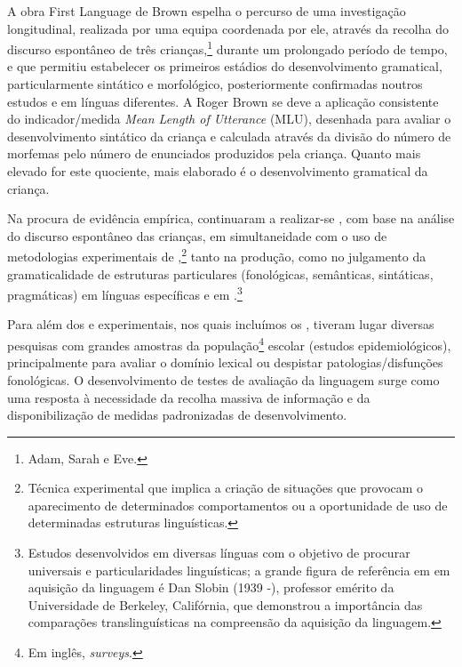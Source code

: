 \documentclass[output=paper]{LSP/langsci}
\begin{document}
A obra  First Language \citeyearpar{brown1973} de Brown espelha o percurso de uma investigação longitudinal, realizada por uma equipa coordenada por ele, através da recolha do discurso espontâneo de três crianças,\footnote{Adam, Sarah e Eve.} durante um prolongado período de tempo, e que permitiu estabelecer os primeiros estádios do desenvolvimento gramatical, particularmente sintático e morfológico, posteriormente confirmadas noutros estudos e em línguas diferentes. A Roger Brown se deve a aplicação consistente do indicador/medida \emph{Mean Length of Utterance} (MLU), desenhada para avaliar o desenvolvimento sintático da criança e calculada através da divisão do número de morfemas pelo número de enunciados produzidos pela criança. Quanto mais elevado for este quociente, mais elaborado é o desenvolvimento gramatical da criança. 

Na procura de evidência empírica, continuaram a realizar-se , com base na análise do discurso espontâneo das crianças, em simultaneidade com o uso de metodologias experimentais de ,\footnote{Técnica experimental que implica a criação de situações que provocam o aparecimento de determinados comportamentos ou a oportunidade de uso de determinadas estruturas linguísticas.} tanto na produção, como no julgamento da gramaticalidade de estruturas particulares (fonológicas, semânticas, sintáticas, pragmáticas) em línguas específicas e em .\footnote{Estudos desenvolvidos em diversas línguas com o objetivo de procurar universais e particularidades linguísticas; a grande figura de referência em  em aquisição da linguagem é Dan Slobin (1939 -), professor emérito da Universidade de Berkeley, Califórnia, que demonstrou a importância das comparações translinguísticas na compreensão da aquisição da linguagem.}

Para além dos  e experimentais, nos quais incluímos os , tiveram lugar diversas pesquisas com grandes amostras da população\footnote{Em inglês, \textit{surveys}.} escolar (estudos epidemiológicos), principalmente para avaliar o domínio lexical ou despistar patologias/disfunções fonológicas. O desenvolvimento de testes de avaliação da linguagem surge como uma resposta à necessidade da recolha massiva de informação e da disponibilização de medidas padronizadas de desenvolvimento. 
\end{document}
